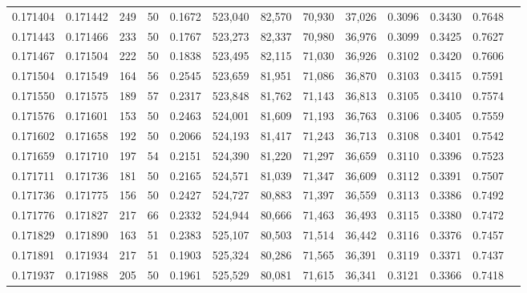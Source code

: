\begin{tabular}{rrrrrrrrrrrrr}
0.171404 & 0.171442 &   249 &  50 &                                     0.1672 & 523,040 &  82,570 &  70,930 &  37,026 & 0.3096 & 0.3430 & 0.7648 \\
0.171443 & 0.171466 &   233 &  50 &                                     0.1767 & 523,273 &  82,337 &  70,980 &  36,976 & 0.3099 & 0.3425 & 0.7627 \\
0.171467 & 0.171504 &   222 &  50 &                                     0.1838 & 523,495 &  82,115 &  71,030 &  36,926 & 0.3102 & 0.3420 & 0.7606 \\
0.171504 & 0.171549 &   164 &  56 &                                     0.2545 & 523,659 &  81,951 &  71,086 &  36,870 & 0.3103 & 0.3415 & 0.7591 \\
0.171550 & 0.171575 &   189 &  57 &                                     0.2317 & 523,848 &  81,762 &  71,143 &  36,813 & 0.3105 & 0.3410 & 0.7574 \\
0.171576 & 0.171601 &   153 &  50 &                                     0.2463 & 524,001 &  81,609 &  71,193 &  36,763 & 0.3106 & 0.3405 & 0.7559 \\
0.171602 & 0.171658 &   192 &  50 &                                     0.2066 & 524,193 &  81,417 &  71,243 &  36,713 & 0.3108 & 0.3401 & 0.7542 \\
0.171659 & 0.171710 &   197 &  54 &                                     0.2151 & 524,390 &  81,220 &  71,297 &  36,659 & 0.3110 & 0.3396 & 0.7523 \\
0.171711 & 0.171736 &   181 &  50 &                                     0.2165 & 524,571 &  81,039 &  71,347 &  36,609 & 0.3112 & 0.3391 & 0.7507 \\
0.171736 & 0.171775 &   156 &  50 &                                     0.2427 & 524,727 &  80,883 &  71,397 &  36,559 & 0.3113 & 0.3386 & 0.7492 \\
0.171776 & 0.171827 &   217 &  66 &                                     0.2332 & 524,944 &  80,666 &  71,463 &  36,493 & 0.3115 & 0.3380 & 0.7472 \\
0.171829 & 0.171890 &   163 &  51 &                                     0.2383 & 525,107 &  80,503 &  71,514 &  36,442 & 0.3116 & 0.3376 & 0.7457 \\
0.171891 & 0.171934 &   217 &  51 &                                     0.1903 & 525,324 &  80,286 &  71,565 &  36,391 & 0.3119 & 0.3371 & 0.7437 \\
0.171937 & 0.171988 &   205 &  50 &                                     0.1961 & 525,529 &  80,081 &  71,615 &  36,341 & 0.3121 & 0.3366 & 0.7418 \\

\end{tabular}
